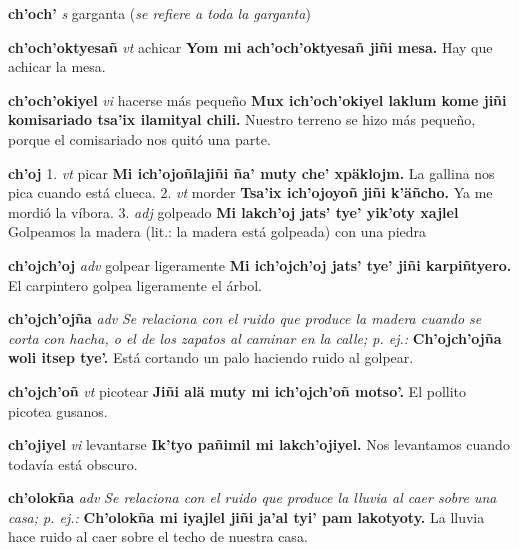 \documentclass[10pt]{scrbook}
\newcommand{\entry}[1]{\textbf{#1}}
\newcommand{\onedefinition}[1]{#1.}
\newcommand{\nontranslationdef}[1]{\textit{#1}}
\newcommand{\partofspeech}[1]{\textit{#1}}
\newcommand{\spanishtranslation}[1]{#1}
\newcommand{\clarification}[1]{(\textit{#1})}
\newcommand{\cholexample}[1]{\textbf{#1}}
\newcommand{\exampletranslation}[1]{#1}
\begin{document}
\begin{multicols}{2}
\entry{ch'och'}
\partofspeech{s}
\spanishtranslation{garganta}
\clarification{se refiere a toda la garganta}

\entry{ch'och'oktyesañ}
\partofspeech{vt}
\spanishtranslation{achicar}
\cholexample{Yom mi ach'och'oktyesañ jiñi mesa.}
\exampletranslation{Hay que achicar la mesa.}

\entry{ch'och'okiyel}
\partofspeech{vi}
\spanishtranslation{hacerse más pequeño}
\cholexample{Mux ich'och'okiyel laklum kome jiñi komisariado tsa'ix ilamityal chili.}
\exampletranslation{Nuestro terreno se hizo más pequeño, porque el comisariado nos quitó una parte.}

\entry{ch'oj}
\onedefinition{1}
\partofspeech{vt}
\spanishtranslation{picar}
\cholexample{Mi ich'ojoñlajiñi ña' muty che' xpäklojm.}
\exampletranslation{La gallina nos pica cuando está clueca.}
\onedefinition{2}
\partofspeech{vt}
\spanishtranslation{morder}
\cholexample{Tsa'ix ich'ojoyoñ jiñi k'äñcho.}
\exampletranslation{Ya me mordió la víbora.}
\onedefinition{3}
\partofspeech{adj}
\spanishtranslation{golpeado}
\cholexample{Mi lakch'oj jats' tye' yik'oty xajlel}
\exampletranslation{Golpeamos la madera (lit.: la madera está golpeada) con una piedra}

\entry{ch'ojch'oj}
\partofspeech{adv}
\spanishtranslation{golpear ligeramente}
\cholexample{Mi ich'ojch'oj jats' tye' jiñi karpiñtyero.}
\exampletranslation{El carpintero golpea ligeramente el árbol.}

\entry{ch'ojch'ojña}
\partofspeech{adv}
\nontranslationdef{Se relaciona con el ruido que produce la madera cuando se corta con hacha, o el de los zapatos al caminar en la calle; p. ej.:}
\cholexample{Ch'ojch'ojña woli itsep tye'.}
\exampletranslation{Está cortando un palo haciendo ruido al golpear.}

\entry{ch'ojch'oñ}
\partofspeech{vt}
\spanishtranslation{picotear}
\cholexample{Jiñi alä muty mi ich'ojch'oñ motso'.}
\exampletranslation{El pollito picotea gusanos.}

\entry{ch'ojiyel}
\partofspeech{vi}
\spanishtranslation{levantarse}
\cholexample{Ik'tyo pañimil mi lakch'ojiyel.}
\exampletranslation{Nos levantamos cuando todavía está obscuro.}

\entry{ch'olokña}
\partofspeech{adv}
\nontranslationdef{Se relaciona con el ruido que produce la lluvia al caer sobre una casa; p. ej.:}
\cholexample{Ch'olokña mi iyajlel jiñi ja'al tyi' pam lakotyoty.}
\exampletranslation{La lluvia hace ruido al caer sobre el techo de nuestra casa.}


\end{multicols}
\end{document}
